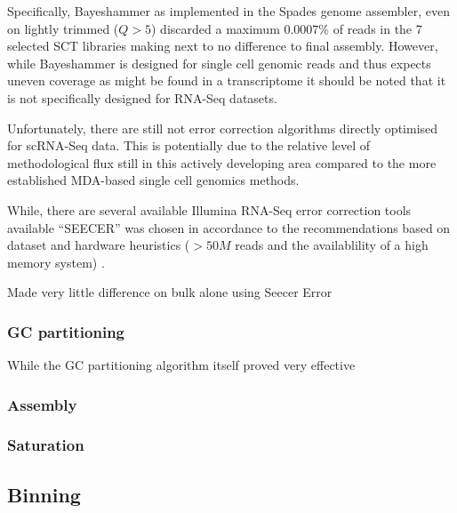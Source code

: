 Specifically, Bayeshammer as implemented in the Spades genome assembler, even on lightly trimmed
(\(Q>5\)) discarded a maximum \(0.0007\%\) of reads in the 7 selected SCT libraries 
making next to no difference to final assembly.  However, while Bayeshammer is designed for
single cell genomic reads and thus expects uneven coverage as might be found in a transcriptome
it should be noted that it is not specifically designed for RNA-Seq datasets.

Unfortunately, there are still not error correction algorithms directly optimised for scRNA-Seq 
data.  This is potentially due to the relative level of methodological flux still in this 
actively developing area compared to the more established MDA-based single cell genomics methods.

While, there are several available Illumina RNA-Seq error correction tools available 
``SEECER'' was chosen in accordance to the recommendations based on dataset and hardware
heuristics (\(>50M\) reads and the availablility of a high memory system) \citep{Macmanes2015}.


Made very little difference on bulk alone using Seecer
Error 


\subsubsection{GC partitioning}

While the GC partitioning algorithm itself proved very effective 


\subsubsection{Assembly}
\subsubsection{Saturation}

\subsection{Binning}

